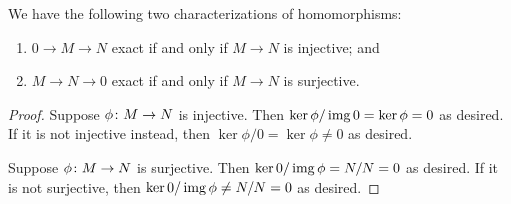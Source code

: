 \begin{proposition}\label{prop:exact-injective}\label{prop:exact-surjective}
    We have the following two characterizations of homomorphisms:
    \begin{enumerate}[label={(\alph*)}, itemsep=0mm]
        \item \(0 \to M \to N\) exact if and only if \(M \to N\) is injective; and
        \item \(M \to N \to 0\) exact if and only if \(M \to N\) is surjective.
    \end{enumerate}
\end{proposition}
\begin{proof}
    Suppose \(\phi\colon M\to N\) is injective.
    Then \(\ker\phi/\operatorname{img} 0 = \ker\phi = 0\) as desired.
    If it is not injective instead, then \(\ker\phi/0 = \ker\phi \neq 0\) as desired.

    Suppose \(\phi\colon M\to N\) is surjective.
    Then \(\ker 0/\operatorname{img}\phi = N/N = 0\) as desired.
    If it is not surjective, then \(\ker 0/\operatorname{img}\phi \neq N/N = 0\) as desired.
\end{proof}

